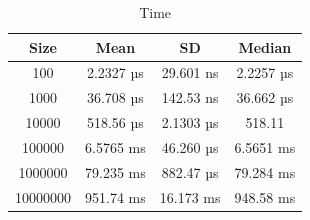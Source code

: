 \documentclass{article}
\begin{document}
\begin{table}[H]
    \centering
    \small
    \caption{Time}
    \vspace{1em}
    \begin{tabular}{ | c | c c c | }
        \hline
        Size     & Mean         & SD          & Median \\
        \hline
        100      & 2.2327 µs    & 29.601 ns   & 2.2257 µs \\
        1000     & 36.708 µs    & 142.53 ns   & 36.662 µs \\
        10000    & 518.56 µs    & 2.1303 µs   & 518.11 \\
        100000   & 6.5765 ms    & 46.260 µs   & 6.5651 ms \\
        1000000  & 79.235 ms    & 882.47 µs   & 79.284 ms \\
        10000000 & 951.74 ms    & 16.173 ms   & 948.58 ms \\
        \hline
    \end{tabular}
\end{table}
\clearpage
\end{document}
